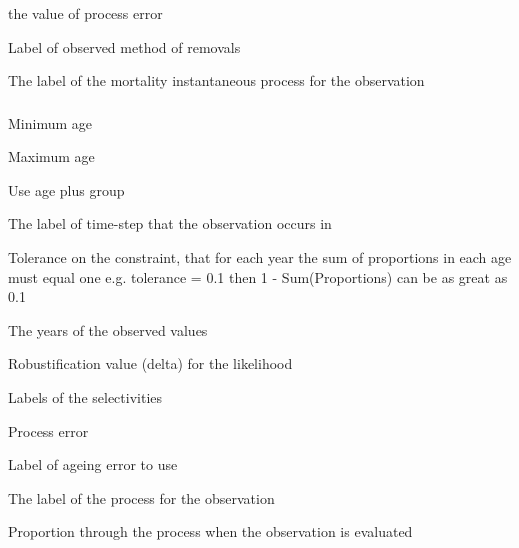  {the value of process error}

 {Label of observed method of removals}

 {The label of the mortality instantaneous process for the observation}

\subsubsection[Process Proportions At Age]{}

 {Minimum age}

 {Maximum age}

 {Use age plus group}

 {The label of time-step that the observation occurs in}

 {Tolerance on the constraint, that for each year the sum of proportions in each age must equal one e.g. tolerance = 0.1 then 1 - Sum(Proportions) can be as great as 0.1}

 {The years of the observed values}

 {Robustification value (delta) for the likelihood}

 {Labels of the selectivities}

 {Process error}

 {Label of ageing error to use}

 {The label of the process for the observation}

 {Proportion through the process when the observation is evaluated}

\subsubsection[Proportions At Age]{}

